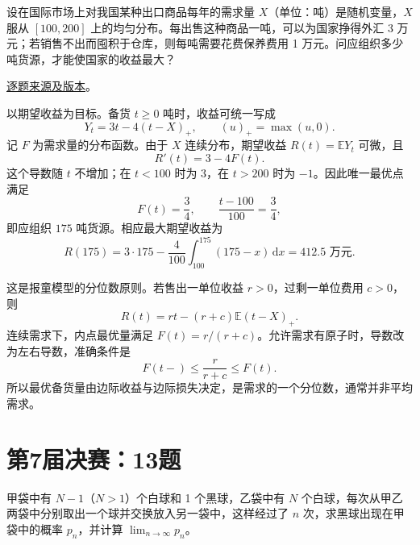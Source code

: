 \begin{example}[公开题解转录]\label{q:fin06-hi:14}

设在国际市场上对我国某种出口商品每年的需求量 $X$（单位：吨）是随机变量，$X$ 服从 $[100,200]$ 上的均匀分布。每出售这种商品一吨，可以为国家挣得外汇 3 万元；若销售不出而囤积于仓库，则每吨需要花费保养费用 1 万元。问应组织多少吨货源，才能使国家的收益最大？

\end{example}

\href{https://github.com/lzxcr/cmc-mathematics/blob/64916fa1fdbc3e444a652eca204d5669058ee321/src/problems/finals/06/15.md}{逐题来源及版本}。

\begin{solve}

以期望收益为目标。备货 $t\ge0$ 吨时，收益可统一写成
\[
Y_t=3t-4(t-X)_+,
\qquad (u)_+=\max(u,0).
\]
记 $F$ 为需求量的分布函数。由于 $X$ 连续分布，期望收益 $R(t)=\mathbb EY_t$ 可微，且
\[
R'(t)=3-4F(t).
\]
这个导数随 $t$ 不增加；在 $t<100$ 时为 $3$，在 $t>200$ 时为 $-1$。因此唯一最优点满足
\[
F(t)=\frac34,
\qquad \frac{t-100}{100}=\frac34,
\]
即应组织 $\boxed{175}$ 吨货源。相应最大期望收益为
\[
R(175)=3\cdot175-\frac4{100}\int_{100}^{175}(175-x)\,\mathrm dx
=412.5\text{ 万元}.
\]

\end{solve}

\begin{remark}[方法与条件]

这是报童模型的分位数原则。若售出一单位收益 $r>0$，过剩一单位费用 $c>0$，则
\[
R(t)=rt-(r+c)\mathbb E(t-X)_+.
\]
连续需求下，内点最优量满足 $F(t)=r/(r+c)$。允许需求有原子时，导数改为左右导数，准确条件是
\[
F(t-)\le\frac r{r+c}\le F(t).
\]
所以最优备货量由边际收益与边际损失决定，是需求的一个分位数，通常并非平均需求。

\end{remark}

\section{第7届决赛：13题}\label{pr:fin07-hi:13}

\begin{example}[公开题解转录]\label{q:fin07-hi:13}

甲袋中有 $N-1$（$N>1$）个白球和 1 个黑球，乙袋中有 $N$ 个白球，每次从甲乙两袋中分别取出一个球并交换放入另一袋中，这样经过了 $n$ 次，求黑球出现在甲袋中的概率 $p_{n}$，并计算 $\lim_{n\to\infty}p_{n}$。

\end{example}


